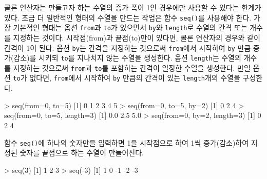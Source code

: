 \documentclass[
]{book}
\newenvironment{Shaded}{\begin{snugshade}}{\end{snugshade}}
\newcommand{\AttributeTok}[1]{\textcolor[rgb]{0.77,0.63,0.00}{#1}}
\newcommand{\DecValTok}[1]{\textcolor[rgb]{0.00,0.00,0.81}{#1}}
\newcommand{\FloatTok}[1]{\textcolor[rgb]{0.00,0.00,0.81}{#1}}
\newcommand{\FunctionTok}[1]{\textcolor[rgb]{0.00,0.00,0.00}{#1}}
\newcommand{\NormalTok}[1]{#1}
\newcommand{\SpecialCharTok}[1]{\textcolor[rgb]{0.00,0.00,0.00}{#1}}
\begin{document}
콜론 연산자는 만들고자 하는 수열의 증가 폭이 1인 경우에만 사용할 수 있다는 한계가 있다. 조금 더 일반적인 형태의 수열을 만드는 작업은 함수 \texttt{seq()}를 사용해야 한다.
가장 기본적인 형태는 옵션 \texttt{from}과 \texttt{to}가 있으면서 \texttt{by}와 \texttt{length}로 수열의 간격 또는 개수를 지정하는 것이다. 시작점(from)과 끝점(to)만이 있다면, 콜론 연산자의 경우와 같이 간격이 1이 된다. 옵션 \texttt{by}는 간격을 지정하는 것으로써 \texttt{from}에서 시작하여 \texttt{by} 만큼 증가(감소)를 시키되 \texttt{to}를 지나치지 않는 수열을 생성한다. 옵션 \texttt{length}는 수열의 개수를 지정하는 것으로써 \texttt{from}과 \texttt{to}를 포함하는 간격이 일정한 수열을 생성한다. 만일 옵션 \texttt{to}가 없다면, \texttt{from}에서 시작하여 \texttt{by} 만큼의 간격이 있는 \texttt{length}개의 수열을 구성한다.

\begin{Shaded}
\begin{Highlighting}[]
\SpecialCharTok{\textgreater{}} \FunctionTok{seq}\NormalTok{(}\AttributeTok{from=}\DecValTok{0}\NormalTok{, }\AttributeTok{to=}\DecValTok{5}\NormalTok{)   }
\NormalTok{[}\DecValTok{1}\NormalTok{] }\DecValTok{0} \DecValTok{1} \DecValTok{2} \DecValTok{3} \DecValTok{4} \DecValTok{5}
\SpecialCharTok{\textgreater{}} \FunctionTok{seq}\NormalTok{(}\AttributeTok{from=}\DecValTok{0}\NormalTok{, }\AttributeTok{to=}\DecValTok{5}\NormalTok{, }\AttributeTok{by=}\DecValTok{2}\NormalTok{)}
\NormalTok{[}\DecValTok{1}\NormalTok{] }\DecValTok{0} \DecValTok{2} \DecValTok{4}
\SpecialCharTok{\textgreater{}} \FunctionTok{seq}\NormalTok{(}\AttributeTok{from=}\DecValTok{0}\NormalTok{, }\AttributeTok{to=}\DecValTok{5}\NormalTok{, }\AttributeTok{length=}\DecValTok{3}\NormalTok{)}
\NormalTok{[}\DecValTok{1}\NormalTok{] }\FloatTok{0.0} \FloatTok{2.5} \FloatTok{5.0}
\SpecialCharTok{\textgreater{}} \FunctionTok{seq}\NormalTok{(}\AttributeTok{from=}\DecValTok{0}\NormalTok{, }\AttributeTok{by=}\DecValTok{2}\NormalTok{, }\AttributeTok{length=}\DecValTok{3}\NormalTok{)}
\NormalTok{[}\DecValTok{1}\NormalTok{] }\DecValTok{0} \DecValTok{2} \DecValTok{4}
\end{Highlighting}
\end{Shaded}

함수 \texttt{seq()}에 하나의 숫자만을 입력하면 1을 시작점으로 하여 1씩 증가(감소)하여 지정된 숫자를 끝점으로 하는 수열이 만들어진다.

\begin{Shaded}
\begin{Highlighting}[]
\SpecialCharTok{\textgreater{}} \FunctionTok{seq}\NormalTok{(}\DecValTok{3}\NormalTok{)}
\NormalTok{[}\DecValTok{1}\NormalTok{] }\DecValTok{1} \DecValTok{2} \DecValTok{3}
\SpecialCharTok{\textgreater{}} \FunctionTok{seq}\NormalTok{(}\SpecialCharTok{{-}}\DecValTok{3}\NormalTok{)}
\NormalTok{[}\DecValTok{1}\NormalTok{]  }\DecValTok{1}  \DecValTok{0} \SpecialCharTok{{-}}\DecValTok{1} \SpecialCharTok{{-}}\DecValTok{2} \SpecialCharTok{{-}}\DecValTok{3}
\end{Highlighting}
\end{Shaded}
\end{document}
